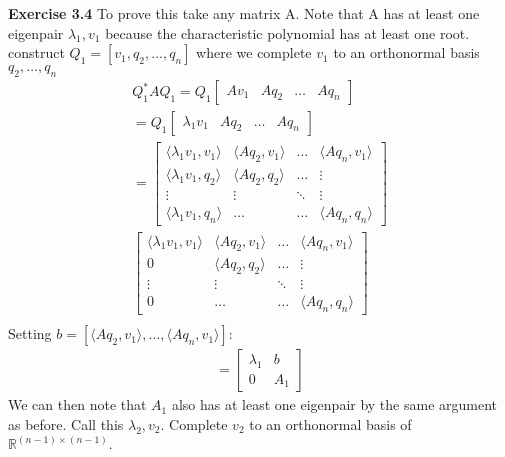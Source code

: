\documentclass[12pt]{article}
\newcommand{\R}{\mathbb{R}}
\newenvironment{exercise}[1]{\vspace{.1in}\noindent\textbf{Exercise #1 \hspace{.05em}}}{}
\theoremstyle{definition}
\theoremstyle{remark}
\begin{document}
\begin{exercise}{3.4}
	To prove this take any matrix A. Note that A has at least one eigenpair $\lambda_1, v_1$ because the characteristic polynomial has at least one root. construct $Q_1=[v_1,q_2,\dots, q_n]$ where we complete $v_1$ to an orthonormal basis $q_2,\dots,q_n$
	\begin{align}
		Q_1^*AQ_1=Q_1 %
		\begin{bmatrix}
			Av_1 & Aq_2 & \dots & Aq_n
		\end{bmatrix}                                                                   \\
		=Q_1 %
		\begin{bmatrix}
			\lambda_1 v_1 & Aq_2 & \dots & Aq_n
		\end{bmatrix}                                                          \\
		=
		\begin{bmatrix}
			\langle \lambda_1v_1,v_1\rangle & \langle Aq_2,v_1\rangle & \dots  & \langle Aq_n,v_1\rangle \\
			\langle\lambda_1v_1,q_2\rangle  & \langle Aq_2,q_2\rangle & \dots  & \vdots                  \\
			\vdots                          & \vdots                  & \ddots & \vdots                  \\
			\langle\lambda_1v_1,q_n\rangle  & \dots                   & \dots  & \langle Aq_n,q_n\rangle
		\end{bmatrix} \\
		\begin{bmatrix}
			\langle \lambda_1v_1,v_1\rangle & \langle Aq_2,v_1\rangle & \dots  & \langle Aq_n,v_1\rangle \\
			0                               & \langle Aq_2,q_2\rangle & \dots  & \vdots                  \\
			\vdots                          & \vdots                  & \ddots & \vdots                  \\
			0                               & \dots                   & \dots  & \langle Aq_n,q_n\rangle
		\end{bmatrix} \\
	\end{align}
	Setting $b=[\langle Aq_2,v_1\rangle,\dots,\langle Aq_n,v_1\rangle]$:
	\begin{align}
		=%
		\begin{bmatrix}
			\lambda_1 & b   \\
			0         & A_1
		\end{bmatrix}
	\end{align}
	We can then note that $A_1$ also has at least one eigenpair by the same argument as before. Call this $\lambda_2,v_2$. Complete $v_2$ to an orthonormal basis of $\R^{(n-1)\times (n-1)}$.


\end{exercise}
\end{document}
